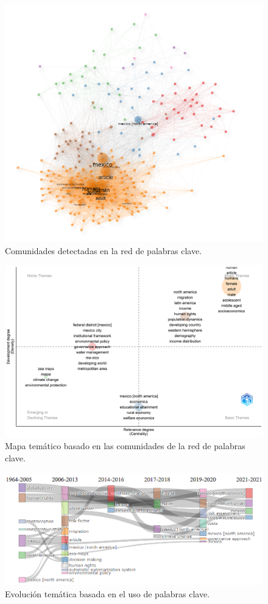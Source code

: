 \begin{figure}[ht]
	\centering
	\includegraphics[width=\textwidth]{imagenes/net_kw_comunidades.png}
	\caption{Comunidades detectadas en la red de palabras clave.}
	\label{fig:kw_comunidades}   
\end{figure}
\begin{figure}[ht]
	\centering
	\includegraphics[width=\textwidth]{imagenes/mapa_tematico.png}
	\caption{Mapa temático basado en las comunidades de la red de palabras clave.}
	\label{fig:kw_comunidades}   
\end{figure}


\begin{figure}[ht]
	\centering
	\includegraphics[width=\textwidth]{imagenes/evolucion_tematica.png}
	\caption{Evolución temática basada en el uso de palabras clave.}
	\label{fig:tematic_map}   
\end{figure}
